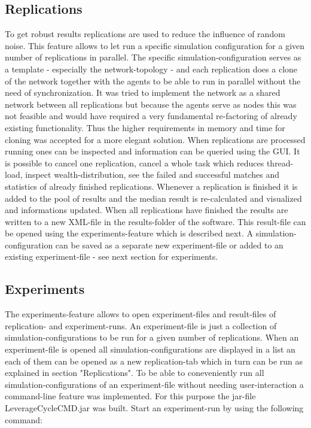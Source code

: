 \documentclass[Bachelorarbeit.tex]{subfiles}
\begin{document}
\subsection{Replications}
To get robust results replications are used to reduce the influence of random noise. This feature allows to let run a specific simulation configuration for a given number of replications in parallel. The specific simulation-configuration serves as a template - especially the network-topology - and each replication does a clone of the network together with the agents to be able to run in parallel without the need of synchronization. It was tried to implement the network as a shared network between all replications but because the agents serve as nodes this was not feasible and would have required a very fundamental re-factoring of already existing functionality. Thus the higher requirements in memory and time for cloning was accepted for a more elegant solution.
When replications are processed running ones can be inspected and information can be queried using the GUI. It is possible to cancel one replication, cancel a whole task which reduces thread-load, inspect wealth-distribution, see the failed and successful matches and statistics of already finished replications. Whenever a replication is finished it is added to the pool of results and the median result is re-calculated and visualized and informations updated. When all replications have finished the results are written to a new XML-file in the results-folder of the software. This result-file can be opened using the experiments-feature which is described next. A simulation-configuration can be saved as a separate new experiment-file or added to an existing experiment-file - see next section for experiments.

\subsection{Experiments}
The experiments-feature allows to open experiment-files and result-files of replication- and experiment-runs. An experiment-file is just a collection of simulation-configurations to be run for a given number of replications. When an experiment-file is opened all simulation-configurations are displayed in a list an each of them can be opened as a new replication-tab which in turn can be run as explained in section "Replications". To be able to coneveniently run all simulation-configurations of an experiment-file without needing user-interaction a command-line feature was implemented. For this purpose the jar-file LeverageCycleCMD.jar was built. Start an experiment-run by using the following command:
\end{document}
